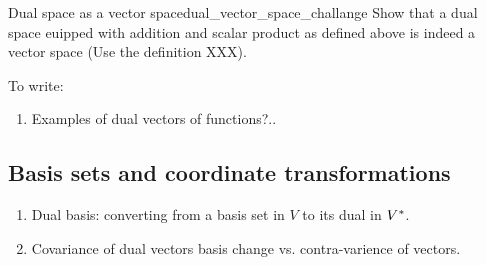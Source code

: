 \begin{challenge}{Dual space as a vector space}{dual_vector_space_challange}
    Show that a dual space euipped with addition and scalar product as defined above is indeed a vector space (Use the definition XXX).
\end{challenge}

To write:
\begin{enumerate}
    \item Examples of dual vectors of functions?..
\end{enumerate}

\subsection{Basis sets and coordinate transformations}
\begin{enumerate}
    \item Dual basis: converting from a basis set in $V$ to its dual in $V^{*}$.
    \item Covariance of dual vectors basis change vs. contra-varience of vectors.
\end{enumerate}
%

